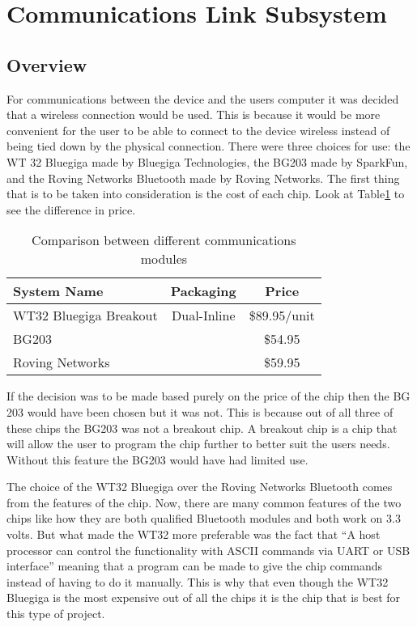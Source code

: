 \section[Wireless Communication]{Communications Link Subsystem}
\subsection{Overview}
For communications between the device and the users computer it was decided 
that a wireless connection would be used.  This is because it would be more 
convenient for the user to be able to connect to the device wireless instead of
 being tied down by the physical connection.  There were three choices for use:
 the WT 32 Bluegiga made by Bluegiga Technologies, the BG203 made by SparkFun, 
and the Roving Networks Bluetooth made by Roving Networks.  The first thing 
that is to be taken into consideration is the cost of each chip. Look at 
Table\ref{tab:bt_prices} to see the difference in price.

\begin{table}[hbp]
\caption{Comparison between different communications modules \cite{web:wt32-price}\cite{web:bg203-price}\cite{web:roving-price}}
\begin{tabular}{l | c c } 
	System Name & Packaging & Price \\\hline
	WT32 Bluegiga Breakout & Dual-Inline & \$89.95/unit \\
	BG203 & & \$54.95 \\
	Roving Networks & & \$59.95
\end{tabular}
\label{tab:bt_prices}
\end{table}

If the decision was to be made based purely on the price of the chip then the 
BG 203 would have been chosen but it was not.  This is because out of all three
 of these chips the BG203 was not a breakout chip.  A breakout chip is a chip 
that will allow the user to program the chip further to better suit the users 
needs.  Without this feature the BG203 would have had limited use.

The choice of the WT32 Bluegiga over the Roving Networks Bluetooth comes from 
the features of the chip.  Now, there are many common features of the two chips
 like how they are both qualified Bluetooth modules and both work on 3.3 volts.
  But what made the WT32 more preferable was the fact that ``A host processor 
can control the functionality with ASCII commands via UART or USB 
interface'' meaning that a program can be made to give the chip commands 
instead of having to do it manually\cite{web:wt32-price}.  This is why that 
even though the WT32 Bluegiga is the most expensive out of all the chips it is 
the chip that is best for this type of project.

